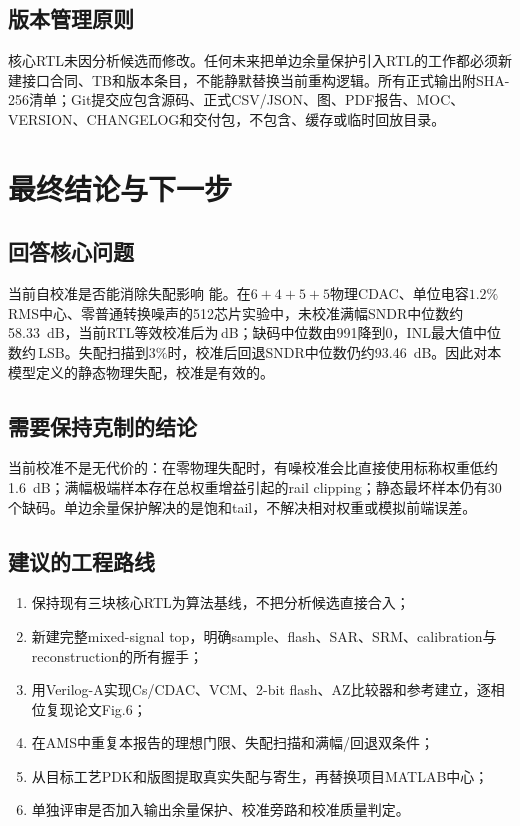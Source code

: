 \documentclass[11pt,a4paper,UTF8,fontset=none,openany]{ctexrep}
\numberwithin{equation}{chapter}
\numberwithin{figure}{chapter}
\numberwithin{table}{chapter}
\begin{document}
\section{版本管理原则}

核心RTL未因分析候选而修改。任何未来把单边余量保护引入RTL的工作都必须新建接口合同、TB和版本条目，不能静默替换当前重构逻辑。所有正式输出附SHA-256清单；Git提交应包含源码、正式CSV/JSON、图、PDF报告、MOC、VERSION、CHANGELOG和交付包，不包含、缓存或临时回放目录。

\chapter{最终结论与下一步}

\section{回答核心问题}

\begin{passbox}{当前自校准是否能消除失配影响}
能。在$6+4+5+5$物理CDAC、单位电容$1.2\%$ RMS中心、零普通转换噪声的512芯片实验中，未校准满幅SNDR中位数约\SI{58.33}{dB}，当前RTL等效校准后为\CurrentFullMedian\,dB；缺码中位数由991降到0，INL最大值中位数约\CurrentInlMedian\,LSB。失配扫描到$3\%$时，校准后回退SNDR中位数仍约\SI{93.46}{dB}。因此对本模型定义的静态物理失配，校准是有效的。
\end{passbox}

\section{需要保持克制的结论}

当前校准不是无代价的：在零物理失配时，有噪校准会比直接使用标称权重低约\SI{1.6}{dB}；满幅极端样本存在总权重增益引起的rail clipping；静态最坏样本仍有30个缺码。单边余量保护解决的是饱和tail，不解决相对权重或模拟前端误差。

\section{建议的工程路线}

\begin{enumerate}
  \item 保持现有三块核心RTL为算法基线，不把分析候选直接合入；
  \item 新建完整mixed-signal top，明确sample、flash、SAR、SRM、calibration与reconstruction的所有握手；
  \item 用Verilog-A实现Cs/CDAC、VCM、2-bit flash、AZ比较器和参考建立，逐相位复现论文Fig.6；
  \item 在AMS中重复本报告的理想门限、失配扫描和满幅/回退双条件；
  \item 从目标工艺PDK和版图提取真实失配与寄生，再替换项目MATLAB中心；
  \item 单独评审是否加入输出余量保护、校准旁路和校准质量判定。
\end{enumerate}
\end{document}
